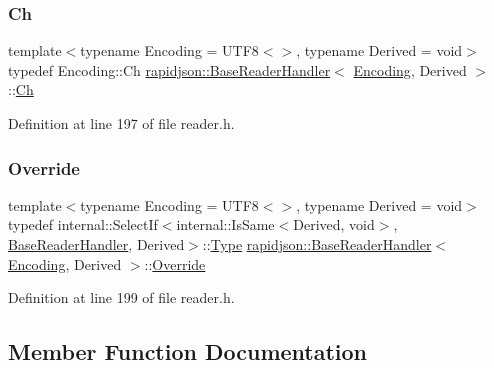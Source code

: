 \subsubsection{\texorpdfstring{Ch}{Ch}}
{\footnotesize\ttfamily template$<$typename Encoding = U\+T\+F8$<$$>$, typename Derived = void$>$ \\
typedef Encoding\+::\+Ch \mbox{\hyperlink{structrapidjson_1_1_base_reader_handler}{rapidjson\+::\+Base\+Reader\+Handler}}$<$ \mbox{\hyperlink{classrapidjson_1_1_encoding}{Encoding}}, Derived $>$\+::\mbox{\hyperlink{structrapidjson_1_1_base_reader_handler_a2932a8ecbb1997dda305f4dbef32ab0d}{Ch}}}



Definition at line 197 of file reader.\+h.

\mbox{\label{structrapidjson_1_1_base_reader_handler_ae61944eee4cb6a3f7f34f3d4edce7eeb}} 
\subsubsection{\texorpdfstring{Override}{Override}}
{\footnotesize\ttfamily template$<$typename Encoding = U\+T\+F8$<$$>$, typename Derived = void$>$ \\
typedef internal\+::\+Select\+If$<$internal\+::\+Is\+Same$<$Derived, void$>$, \mbox{\hyperlink{structrapidjson_1_1_base_reader_handler}{Base\+Reader\+Handler}}, Derived$>$\+::\mbox{\hyperlink{namespacerapidjson_ae79a4751c1c460ff0de5ecc07874f3e4}{Type}} \mbox{\hyperlink{structrapidjson_1_1_base_reader_handler}{rapidjson\+::\+Base\+Reader\+Handler}}$<$ \mbox{\hyperlink{classrapidjson_1_1_encoding}{Encoding}}, Derived $>$\+::\mbox{\hyperlink{structrapidjson_1_1_base_reader_handler_ae61944eee4cb6a3f7f34f3d4edce7eeb}{Override}}}



Definition at line 199 of file reader.\+h.



\subsection{Member Function Documentation}
\mbox{\label{structrapidjson_1_1_base_reader_handler_aead125c32fbf2a1311a2ba9c95b8604a}} 
